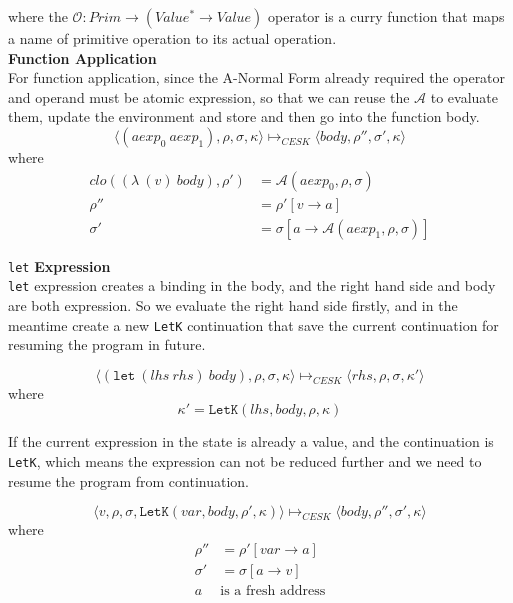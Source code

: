 \documentclass[paper=a4, fontsize=11pt]{scrartcl} %
\numberwithin{equation}{section} %
\numberwithin{figure}{section} %
\numberwithin{table}{section} %
\begin{document}
where the $\mathcal{O} : Prim \rightarrow (Value^* \rightarrow Value)$ operator is a curry function that maps a name of primitive operation to its actual operation.\\

\textbf{Function Application}\\
For function application, since the A-Normal Form already required the operator and operand must be atomic expression, so that we can reuse the $\mathcal{A}$ to evaluate them, update the environment and store and then go into the function body.
$$ \langle (aexp_0~aexp_1), \rho, \sigma, \kappa \rangle \longmapsto_{CESK} \langle body, \rho'', \sigma', \kappa \rangle $$
where 
\begin{align*}
clo((\lambda~(v)~body), \rho') & = \mathcal{A}(aexp_0, \rho, \sigma) \\
\rho'' & = \rho'[v \rightarrow a] \\
\sigma' & = \sigma[a \rightarrow \mathcal{A}(aexp_1, \rho, \sigma)]
\end{align*}

\texttt{let} \textbf{Expression}\\
\texttt{let} expression creates a binding in the body, and the right hand side and body are both expression. So we evaluate the right hand side firstly, and in the meantime create a new \texttt{LetK} continuation that save the current continuation for resuming the program in future.

$$ \langle (\texttt{let}~(lhs~rhs)~body), \rho, \sigma, \kappa \rangle \longmapsto_{CESK} \langle rhs, \rho, \sigma, \kappa' \rangle $$
where
$$ \kappa' = \texttt{LetK}(lhs, body, \rho, \kappa) $$

If the current expression in the state is already a value, and the continuation is \texttt{LetK}, which means the expression can not be reduced further and we need to resume the program from continuation.

$$ \langle v, \rho, \sigma, \texttt{LetK}(var, body, \rho', \kappa) \rangle \longmapsto_{CESK} \langle body, \rho'', \sigma', \kappa \rangle $$
where
\begin{align*}
\rho'' & = \rho'[var \rightarrow a] \\
\sigma' & = \sigma[a \rightarrow v] \\
a~&\mbox{is a fresh address}
\end{align*}
\end{document}
